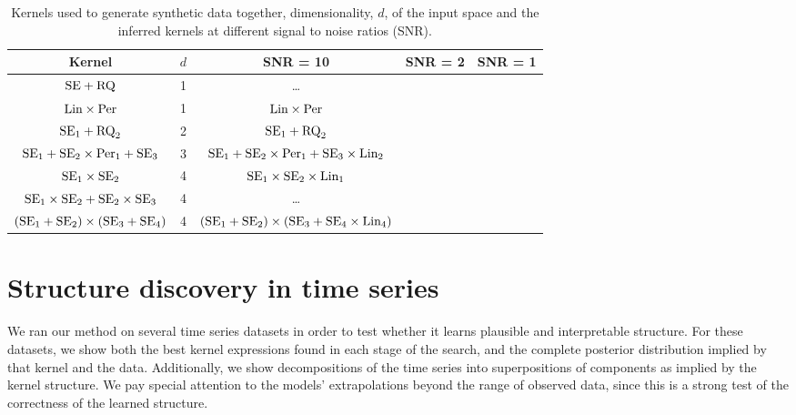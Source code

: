 \documentclass[twoside]{article}
\begin{document}
\begin{table}[ht!]
\caption{{\small
Kernels used to generate synthetic data together, dimensionality, $d$, of the input space and the inferred kernels at different signal to noise ratios (SNR).
}}
\label{tbl:synthetic}
\begin{center}
\begin{tabular}{c c | c c c}
Kernel & $d$ & SNR = 10 & SNR = 2 & SNR = 1 \\
\hline
$\textrm{SE} + \textrm{RQ}$                               & 1 & \ldots \\
$\textrm{Lin} \times \textrm{Per}$                        & 1 & $\textrm{Lin} \times \textrm{Per}$ \\
$\textrm{SE}_1 + \textrm{RQ}_2$                           & 2 & $\textrm{SE}_1 + \textrm{RQ}_2$ \\
$\textrm{SE}_1 + \textrm{SE}_2 \times \textrm{Per}_1 + \textrm{SE}_3$     & 3 & $\textrm{SE}_1 + \textrm{SE}_2 \times \textrm{Per}_1 + \textrm{SE}_3 \times \textrm{Lin}_2$ \\
$\textrm{SE}_1 \times \textrm{SE}_2$                      & 4 & $\textrm{SE}_1 \times \textrm{SE}_2 \times \textrm{Lin}_1$ \\
$\textrm{SE}_1 \times \textrm{SE}_2 + \textrm{SE}_2 \times \textrm{SE}_3$ & 4 & \ldots\\
$(\textrm{SE}_1 + \textrm{SE}_2) \times (\textrm{SE}_3 + \textrm{SE}_4)$  & 4 & $(\textrm{SE}_1 + \textrm{SE}_2) \times (\textrm{SE}_3 + \textrm{SE}_4\times\textrm{Lin}_4)$\\
\end{tabular}
\end{center}
\end{table}

\section{Structure discovery in time series}


We ran our method on several time series datasets in order to test whether it learns plausible and interpretable structure. 
For these datasets, we show both the best kernel expressions found in each stage of the search, and the complete posterior distribution implied by that kernel and the data. 
Additionally, we show decompositions of the time series into superpositions of components as implied by the kernel structure.
We pay special attention to the models' extrapolations beyond the range of observed data, since this is a strong test of the correctness of the learned structure.
\end{document}
